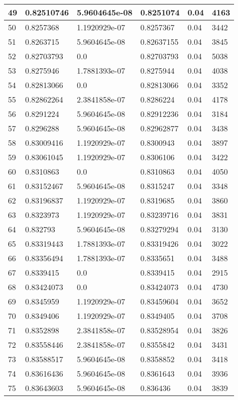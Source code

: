 \begin{longtable}{|l|l|l|l|l|l|}
49 & 0.82510746 & 5.9604645e-08 & 0.8251074 & 0.04 & 4163 \\ \hline 
50 & 0.8257368 & 1.1920929e-07 & 0.8257367 & 0.04 & 3442 \\ \hline 
51 & 0.8263715 & 5.9604645e-08 & 0.82637155 & 0.04 & 3845 \\ \hline 
52 & 0.82703793 & 0.0 & 0.82703793 & 0.04 & 5038 \\ \hline 
53 & 0.8275946 & 1.7881393e-07 & 0.8275944 & 0.04 & 4038 \\ \hline 
54 & 0.82813066 & 0.0 & 0.82813066 & 0.04 & 3352 \\ \hline 
55 & 0.82862264 & 2.3841858e-07 & 0.8286224 & 0.04 & 4178 \\ \hline 
56 & 0.8291224 & 5.9604645e-08 & 0.82912236 & 0.04 & 3184 \\ \hline 
57 & 0.8296288 & 5.9604645e-08 & 0.82962877 & 0.04 & 3438 \\ \hline 
58 & 0.83009416 & 1.1920929e-07 & 0.8300943 & 0.04 & 3897 \\ \hline 
59 & 0.83061045 & 1.1920929e-07 & 0.8306106 & 0.04 & 3422 \\ \hline 
60 & 0.8310863 & 0.0 & 0.8310863 & 0.04 & 4050 \\ \hline 
61 & 0.83152467 & 5.9604645e-08 & 0.8315247 & 0.04 & 3348 \\ \hline 
62 & 0.83196837 & 1.1920929e-07 & 0.8319685 & 0.04 & 3860 \\ \hline 
63 & 0.8323973 & 1.1920929e-07 & 0.83239716 & 0.04 & 3831 \\ \hline 
64 & 0.832793 & 5.9604645e-08 & 0.83279294 & 0.04 & 3130 \\ \hline 
65 & 0.83319443 & 1.7881393e-07 & 0.83319426 & 0.04 & 3022 \\ \hline 
66 & 0.83356494 & 1.7881393e-07 & 0.8335651 & 0.04 & 3488 \\ \hline 
67 & 0.8339415 & 0.0 & 0.8339415 & 0.04 & 2915 \\ \hline 
68 & 0.83424073 & 0.0 & 0.83424073 & 0.04 & 4730 \\ \hline 
69 & 0.8345959 & 1.1920929e-07 & 0.83459604 & 0.04 & 3652 \\ \hline 
70 & 0.8349406 & 1.1920929e-07 & 0.8349405 & 0.04 & 3708 \\ \hline 
71 & 0.8352898 & 2.3841858e-07 & 0.83528954 & 0.04 & 3826 \\ \hline 
72 & 0.83558446 & 2.3841858e-07 & 0.8355842 & 0.04 & 3431 \\ \hline 
73 & 0.83588517 & 5.9604645e-08 & 0.8358852 & 0.04 & 3418 \\ \hline 
74 & 0.83616436 & 5.9604645e-08 & 0.8361643 & 0.04 & 3936 \\ \hline 
75 & 0.83643603 & 5.9604645e-08 & 0.836436 & 0.04 & 3839 \\ \hline 
\end{longtable}